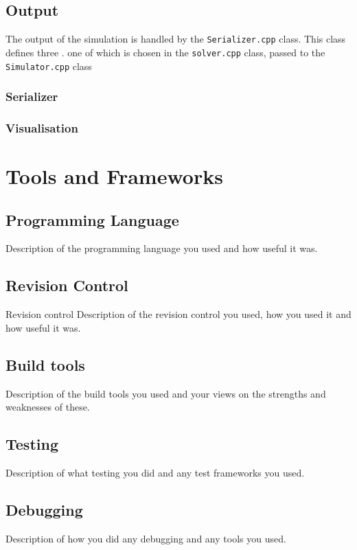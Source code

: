 \documentclass[a4paper,11pt]{article}
\begin{document}
\subsection{Output}\label{output}

The output of the simulation is handled by the \texttt{Serializer.cpp} class.  This class defines three . one of which is chosen in the \texttt{solver.cpp} class, passed to the \texttt{Simulator.cpp} class

\subsubsection{Serializer}

\subsubsection{Visualisation}

\section{Tools and Frameworks}

\subsection{Programming Language}
Description of the programming language you used and how useful it was.

\subsection{Revision Control}
Revision control Description of the revision control you used, how you used it and how useful it was.

\subsection{Build tools}
Description of the build tools you used and your views on the strengths and weaknesses of these.

\subsection{Testing}
Description of what testing you did and any test frameworks you used.

\subsection{Debugging}
 Description of how you did any debugging and any tools you used.
 
\end{document}
